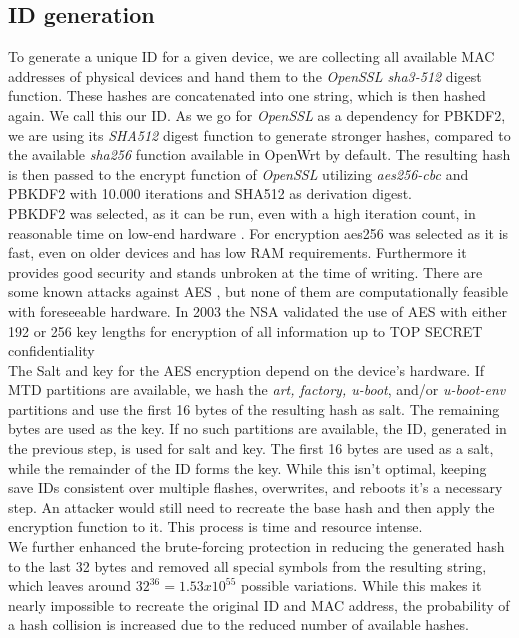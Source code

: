 \subsection{ID generation}
    To generate a unique ID for a given device, we are collecting all available MAC addresses of physical devices and hand them to the \textit{OpenSSL sha3-512} digest function. These hashes are concatenated into one string, which is then hashed again. We call this our ID. As we go for \textit{OpenSSL} as a dependency for PBKDF2, we are using its \textit{SHA512} digest function to generate stronger hashes, compared to the available \textit{sha256} function available in OpenWrt by default. The resulting hash is then passed to the encrypt function of \textit{OpenSSL} utilizing \textit{aes256-cbc} and PBKDF2 with 10.000 iterations and SHA512 as derivation digest.\\
    PBKDF2 was selected, as it can be run, even with a high iteration count, in reasonable time on low-end hardware \cite{ertaul_implementation_2016}. For encryption aes256 was selected as it is fast, even on older devices and has low RAM requirements. Furthermore it provides good security and stands unbroken at the time of writing. There are some known attacks against AES  \cite{schneier_another_2009} \cite{lu_new_2008} \cite{bernstein_cache-timing_nodate} \cite{biryukov_key_2009}, but none of them are computationally feasible with foreseeable hardware. In 2003 the NSA validated the use of AES with either 192 or 256 key lengths for encryption of all information up to TOP SECRET confidentiality \cite{noauthor_national_2003}\\
    
        The Salt and key for the AES encryption depend on the device's hardware. If MTD partitions are available, we hash the \textit{art, factory, u-boot}, and/or \textit{u-boot-env} partitions and use the first 16 bytes of the resulting hash as salt. The remaining bytes are used as the key. If no such partitions are available, the ID, generated in the previous step, is used for salt and key. The first 16 bytes are used as a salt, while the remainder of the ID forms the key. While this isn't optimal, keeping save IDs consistent over multiple flashes, overwrites, and reboots it's a necessary step. An attacker would still need to recreate the base hash and then apply the encryption function to it. This process is time and resource intense.\\
    
     We further enhanced the brute-forcing protection in reducing the generated hash to the last 32 bytes and removed all special symbols from the resulting string, which leaves around $32^{36} = 1.53x10^{55}$ possible variations. While this makes it nearly impossible to recreate the original ID and MAC address, the probability of a hash collision is increased due to the reduced number of available hashes.\\
    
